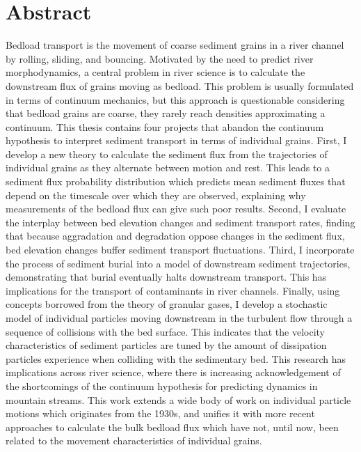 
\chapter{Abstract}

Bedload transport is the movement of coarse sediment grains in a river channel by rolling, sliding, and bouncing.
Motivated by the need to predict river morphodynamics, a central problem in river science is to calculate the downstream flux of grains moving as bedload.
This problem is usually formulated in terms of continuum mechanics, but this approach is questionable considering that bedload grains are coarse, they rarely reach densities approximating a continuum.
This thesis contains four projects that abandon the continuum hypothesis to interpret sediment transport in terms of individual grains.
First, I develop a new theory to calculate the sediment flux from the trajectories of individual grains as they alternate between motion and rest.
This leads to a sediment flux probability distribution which predicts mean sediment fluxes that depend on the timescale over which they are observed, explaining why measurements of the bedload flux can give such poor results.
Second, I evaluate the interplay between bed elevation changes and sediment transport rates, finding that because aggradation and degradation oppose changes in the sediment flux, bed elevation changes buffer sediment transport fluctuations.
Third, I incorporate the process of sediment burial into a model of downstream sediment trajectories, demonstrating that burial eventually halts downstream transport.
This has implications for the transport of contaminants in river channels.
Finally, using concepts borrowed from the theory of granular gases, I develop a stochastic model of individual particles moving downstream in the turbulent flow through a sequence of collisions with the bed surface. This indicates that the velocity characteristics of sediment particles are tuned by the amount of dissipation particles experience when colliding with the sedimentary bed.
This research has implications across river science, where there is increasing acknowledgement of the shortcomings of the continuum hypothesis for predicting dynamics in mountain streams. This work extends a wide body of work on individual particle motions which originates from the 1930s, and unifies it with more recent approaches to calculate the bulk bedload flux which have not, until now, been related to the movement characteristics of individual grains.

